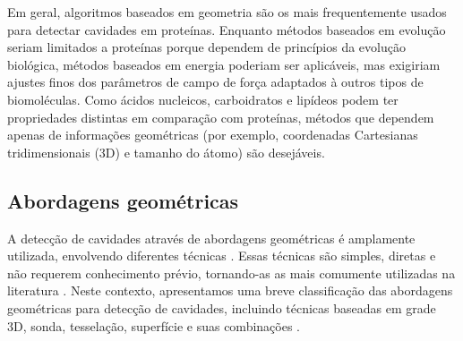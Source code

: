 \documentclass[Portugues]{phdquali}
\begin{document}
Em geral, algoritmos baseados em geometria são os mais frequentemente usados para detectar cavidades em proteínas. Enquanto métodos baseados em evolução seriam limitados a proteínas porque dependem de princípios da evolução biológica, métodos baseados em energia poderiam ser aplicáveis, mas exigiriam ajustes finos dos parâmetros de campo de força adaptados à outros tipos de biomoléculas. Como ácidos nucleicos, carboidratos e lipídeos podem ter propriedades distintas em comparação com proteínas, métodos que dependem apenas de informações geométricas (por exemplo, coordenadas Cartesianas tridimensionais (3D) e tamanho do átomo) são desejáveis.

\subsection{Abordagens geométricas \label{sec:geometric-approaches}}

A detecção de cavidades através de abordagens geométricas é amplamente utilizada, envolvendo diferentes técnicas \cite{simoes2017,guerra2020,krone2016}. Essas técnicas são simples, diretas e não requerem conhecimento prévio, tornando-as as mais comumente utilizadas na literatura \cite{henrich2010,oliveira2014}. Neste contexto, apresentamos uma breve classificação das abordagens geométricas para detecção de cavidades, incluindo técnicas baseadas em grade 3D, sonda, tesselação, superfície e suas combinações \cite{simoes2017,guerra2020,krone2016,guerra2023B}.
\end{document}
